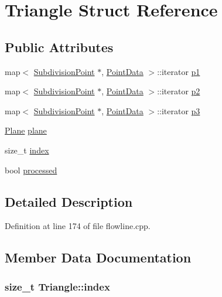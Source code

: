 \hypertarget{structTriangle}{}\section{Triangle Struct Reference}
\label{structTriangle}
\subsection*{Public Attributes}
\begin{DoxyCompactItemize}
\item 
map$<$ \hyperlink{classShipCAD_1_1SubdivisionPoint}{Subdivision\+Point} $\ast$, \hyperlink{structPointData}{Point\+Data} $>$\+::iterator \hyperlink{structTriangle_a0bd45e80838b35f6039141b54825021c}{p1}
\item 
map$<$ \hyperlink{classShipCAD_1_1SubdivisionPoint}{Subdivision\+Point} $\ast$, \hyperlink{structPointData}{Point\+Data} $>$\+::iterator \hyperlink{structTriangle_a262c0985278b81e4a35e45abc6634c77}{p2}
\item 
map$<$ \hyperlink{classShipCAD_1_1SubdivisionPoint}{Subdivision\+Point} $\ast$, \hyperlink{structPointData}{Point\+Data} $>$\+::iterator \hyperlink{structTriangle_a05641ea7149f1b30a2f9532f15f77ea2}{p3}
\item 
\hyperlink{classShipCAD_1_1Plane}{Plane} \hyperlink{structTriangle_ada7eceff17634fee881e0f679941aaaa}{plane}
\item 
size\+\_\+t \hyperlink{structTriangle_a13e8565342a2d9e5752facfed979b128}{index}
\item 
bool \hyperlink{structTriangle_aaeb1bcbff3141c314e7f9d2212cbc11c}{processed}
\end{DoxyCompactItemize}


\subsection{Detailed Description}


Definition at line 174 of file flowline.\+cpp.



\subsection{Member Data Documentation}
\subsubsection[{\texorpdfstring{index}{index}}]{\setlength{\rightskip}{0pt plus 5cm}size\+\_\+t Triangle\+::index}\hypertarget{structTriangle_a13e8565342a2d9e5752facfed979b128}{}\label{structTriangle_a13e8565342a2d9e5752facfed979b128}


